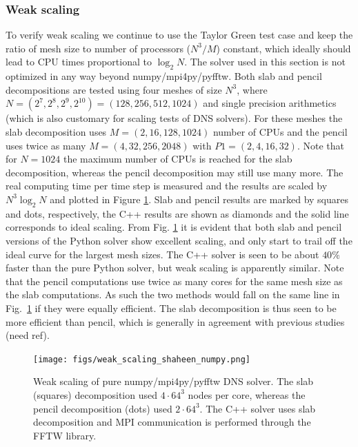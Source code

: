 \documentclass[11pt, oneside]{article}
\begin{document}
\subsubsection{Weak scaling}
To verify weak scaling we continue to use the Taylor Green test case and keep the ratio of mesh size to number of processors ($N^3/M$) constant, which ideally should lead to CPU times proportional to $\log_2 N$. The solver used in this section is not optimized in any way beyond numpy/mpi4py/pyfftw. 
Both slab and pencil decompositions are tested using four meshes of size $N^3$, where $N=(2^7, 2^8, 2^9, 2^{10}) =(128, 256, 512, 1024)$ and single precision arithmetics (which is also customary for scaling tests of DNS solvers). For these meshes the slab decomposition uses $M=(2, 16, 128, 1024)$ number of CPUs and the pencil uses twice as many $M=(4, 32, 256, 2048)$ with $P1=(2, 4, 16, 32)$. 
Note that for $N=1024$ the maximum number of CPUs is reached for the slab decomposition, whereas the pencil 
decomposition may still use many more. The real computing time per time step is measured and the results 
are scaled by $N^3 \log_2N$ and plotted in Figure \ref{fig:weak_scaling_shaheen}. Slab and pencil results 
are marked by squares and dots, respectively, the C++ results are shown as diamonds and the solid line 
corresponds to ideal scaling. From Fig. \ref{fig:weak_scaling_shaheen} it is evident that both slab and pencil versions of the Python solver show excellent scaling, 
and only start to trail off the ideal curve for the largest mesh sizes. The C++ solver is seen to be about $40 \%$ faster than the pure
Python solver, but weak scaling is apparently similar. Note that the pencil computations use twice as many cores for the same mesh 
size as the slab computations. As such the two methods would fall on the same line in 
Fig.~\ref{fig:weak_scaling_shaheen} if they were equally efficient. The slab decomposition is thus seen to 
be more efficient than pencil, which is generally in agreement with previous studies (need ref).

\begin{figure}
\texttt{[image: figs/weak\_scaling\_shaheen\_numpy.png]}
\caption{Weak scaling of pure numpy/mpi4py/pyfftw DNS solver. The slab (squares) decomposition used $4 \cdot 64^3$ nodes per core, whereas the pencil decomposition (dots) used $2 \cdot 64^3 $. The C++ solver uses slab decomposition and MPI communication is performed through the FFTW library. }
\label{fig:weak_scaling_shaheen}
\end{figure}
\end{document}
